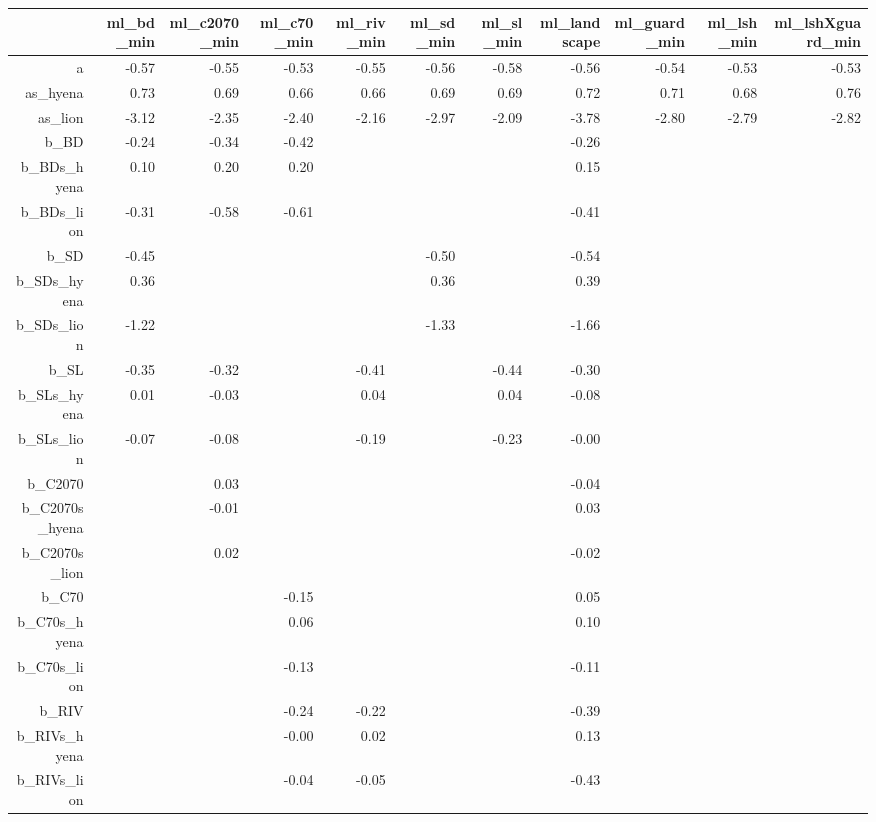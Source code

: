 \begin{table}[ht]
\centering
\begin{tabular}{rrrrrrrrrrr}
  \hline
 & ml\_bd\_min & ml\_c2070\_min & ml\_c70\_min & ml\_riv\_min & ml\_sd\_min & ml\_sl\_min & ml\_landscape & ml\_guard\_min & ml\_lsh\_min & ml\_lshXguard\_min \\ 
  \hline
a & -0.57 & -0.55 & -0.53 & -0.55 & -0.56 & -0.58 & -0.56 & -0.54 & -0.53 & -0.53 \\ 
  as\_hyena & 0.73 & 0.69 & 0.66 & 0.66 & 0.69 & 0.69 & 0.72 & 0.71 & 0.68 & 0.76 \\ 
  as\_lion & -3.12 & -2.35 & -2.40 & -2.16 & -2.97 & -2.09 & -3.78 & -2.80 & -2.79 & -2.82 \\ 
  b\_BD & -0.24 & -0.34 & -0.42 &  &  &  & -0.26 &  &  &  \\ 
  b\_BDs\_hyena & 0.10 & 0.20 & 0.20 &  &  &  & 0.15 &  &  &  \\ 
  b\_BDs\_lion & -0.31 & -0.58 & -0.61 &  &  &  & -0.41 &  &  &  \\ 
  b\_SD & -0.45 &  &  &  & -0.50 &  & -0.54 &  &  &  \\ 
  b\_SDs\_hyena & 0.36 &  &  &  & 0.36 &  & 0.39 &  &  &  \\ 
  b\_SDs\_lion & -1.22 &  &  &  & -1.33 &  & -1.66 &  &  &  \\ 
  b\_SL & -0.35 & -0.32 &  & -0.41 &  & -0.44 & -0.30 &  &  &  \\ 
  b\_SLs\_hyena & 0.01 & -0.03 &  & 0.04 &  & 0.04 & -0.08 &  &  &  \\ 
  b\_SLs\_lion & -0.07 & -0.08 &  & -0.19 &  & -0.23 & -0.00 &  &  &  \\ 
  b\_C2070 &  & 0.03 &  &  &  &  & -0.04 &  &  &  \\ 
  b\_C2070s\_hyena &  & -0.01 &  &  &  &  & 0.03 &  &  &  \\ 
  b\_C2070s\_lion &  & 0.02 &  &  &  &  & -0.02 &  &  &  \\ 
  b\_C70 &  &  & -0.15 &  &  &  & 0.05 &  &  &  \\ 
  b\_C70s\_hyena &  &  & 0.06 &  &  &  & 0.10 &  &  &  \\ 
  b\_C70s\_lion &  &  & -0.13 &  &  &  & -0.11 &  &  &  \\ 
  b\_RIV &  &  & -0.24 & -0.22 &  &  & -0.39 &  &  &  \\ 
  b\_RIVs\_hyena &  &  & -0.00 & 0.02 &  &  & 0.13 &  &  &  \\ 
  b\_RIVs\_lion &  &  & -0.04 & -0.05 &  &  & -0.43 &  &  &  \\ 

\end{tabular}
\end{table}
